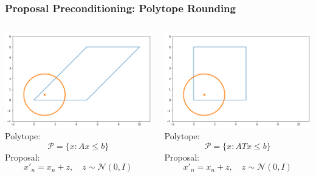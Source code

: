 \begin{frame}[t]
    \frametitle{Proposal Preconditioning: Polytope Rounding}
	\begin{columns}
        \begin{column}{0.3\textwidth}
            \includegraphics[width=\textwidth]{imgs/no-preconditioning.png}
            Polytope:
            \[
                \mathcal{P} = \{ x : Ax \leq b \}
            \]
            Proposal:
            \[
                x'_{n} = x_n + z, \quad z \sim \mathcal{N}(0,I)
            \]
        \end{column}
        \begin{column}{0.3\textwidth}
            \includegraphics[width=\textwidth]{imgs/proposal-preconditioning.png}
            Polytope:
            \[
                \mathcal{P} = \{ x : ATx \leq b \}
            \]
            Proposal:
            \[
                x'_{n} = x_n + z, \quad z \sim \mathcal{N}(0,I)
            \]
        \end{column}

\end{columns}
\end{frame}
